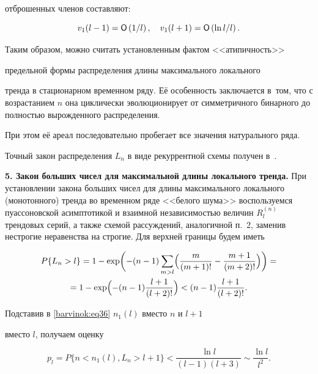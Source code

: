 отброшенных членов составляют:

\[

v_1 (l-1)={\sf O}\left({1}/{l} \right), \quad 

v_1 (l+1)={\sf O}\left({\ln  l }/{l} \right).

\]



Таким образом, можно считать установленным фактом <<атипичность>>

предельной формы распределения длины максимального локального

тренда в стационарном временном ряду. Её особенность заключается в~том, что с возрастанием $n$ она циклически эволюционирует от симметричного бинарного до полностью вырожденного распределения.

При этом её ареал последовательно пробегает все значения натурального ряда. 

Точный закон распределения $L_n$ в виде рекуррентной схемы получен в~\cite{barvinok:bib8}.



\smallskip



\textbf{5. Закон больших чисел для максимальной длины локального тренда.} При установлении закона больших чисел для длины максимального локального (монотонного) тренда во временном ряде <<белого шума>> воспользуемся пуассоновской асимптотикой и взаимной независимостью величин $R_l^{(n)} $ трендовых серий, а также схемой рассуждений, аналогичной п.~2, заменив нестрогие неравенства на строгие. Для верхней границы будем иметь

\begin{multline}

\label{barvinok:eq36}

 P \{ L_n >l \}=1-\exp \biggl(

-(n-1)\sum\limits_{m>l} \Bigl( \frac{m}{(m+1)!}-\frac{m+1}{(m+2)!}

\Bigr) \biggr)=\\

=1-\exp \Bigl( -(n-1)\frac{l+1}{(l+2)!} 

\Bigr)<(n-1)\frac{l+1}{(l+2)!}.

\end{multline}



Подставив в \eqref{barvinok:eq36} $n_1 ( l )$ вместо $n$ и $l+1$

вместо $l$, получаем оценку

\begin{equation}

\label{barvinok:eq37}

p_l =

 P\{ n<n_1 (l),L_n >l+1\}<\frac{\ln l}{(l-1) (l+3)}\sim \frac{\ln l}{l^2}.

\end{equation}

